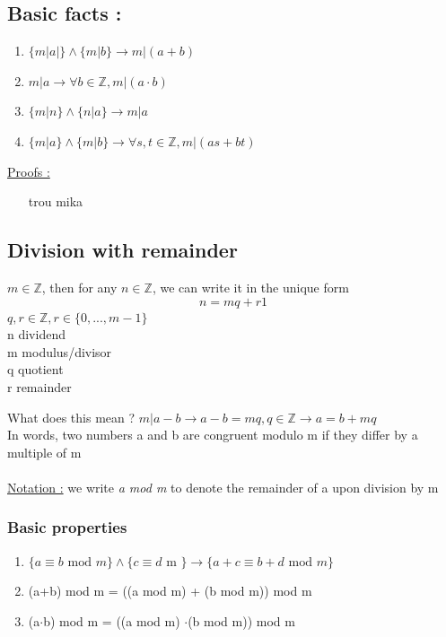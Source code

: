 \documentclass[12pt,a4paper]{article}
\begin{document}
\subsection{Basic facts :}
\begin{enumerate}
\item $\{m|a|\} \wedge \{m|b\} \to m|(a+b)$
\item $m|a \to \forall b \in \mathbb{Z}, m|(a\cdot b)$
\item $\{m|n\} \wedge \{n|a\} \to m|a$
\item $\{m|a\} \wedge \{m|b\} \to \forall s,t \in \mathbb{Z}, m|(as + b t)$
\end{enumerate}
\underline{Proofs :}
\begin{enumerate}
\item [trou mika]
\end{enumerate}
\subsection{Division with remainder}
$m \in \mathbb{Z}$, then for any $n\in\mathbb{Z}$, we can write it in the unique form
\begin{equation*}
n = mq + r1
\end{equation*}
$q,r \in \mathbb{Z}, r \in \{0,...,m-1\}$\\
n dividend\\
m modulus/divisor\\
q quotient\\
r remainder\\

\begin{center}
\end{center}
What does this mean ? $m|a-b \to a-b = mq, q \in \mathbb{Z} \to a= b + mq$\\
In words, two numbers a and b are congruent modulo m if they differ by a multiple of m\\
\\
\underline{Notation :} we write \textit{a mod m} to denote the remainder of a upon division by m

\subsubsection{Basic properties}
\begin{enumerate}
\item $\{a \equiv b \text{ mod } m\} \wedge \{c \equiv d \text{ m }\} \to \{a+c \equiv b+d \text{ mod } m\}$
\item(a+b) mod m = ((a mod m) + (b mod m)) mod m
\item (a$\cdot$b) mod m = ((a mod m) $\cdot$(b mod m)) mod m
\end{enumerate}
\end{document}
